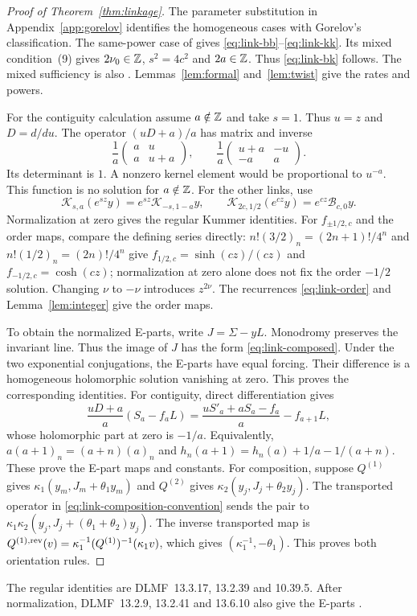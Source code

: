 \begin{proof}[Proof of Theorem~\ref{thm:linkage}]
The parameter substitution in Appendix~\ref{app:gorelov} identifies the
homogeneous cases with Gorelov's classification. The same-power case of
\cite[Lemma~14, using Lemma~12, p.~7]{Gorelov2021} gives
\eqref{eq:link-bb}--\eqref{eq:link-kk}. Its mixed condition~(9)
\cite[p.~3]{Gorelov2021} gives
$2\nu_0\in\mathbb{Z}$, $s^2=4c^2$ and $2a\in\mathbb{Z}$. Thus
\eqref{eq:link-bk} follows. The mixed sufficiency is also
\cite[Theorem~2, p.~138]{Gorelov2020}. Lemmas~\ref{lem:formal}
and~\ref{lem:twist} give the rates and powers.

For the contiguity calculation assume $a\notin\mathbb{Z}$ and take $s=1$. Thus $u=z$ and $D=d/du$.
The operator $(uD+a)/a$ has matrix and inverse
\begin{equation}\label{eq:contiguity-matrix}
 \frac1a\begin{pmatrix}a&u\\a&u+a\end{pmatrix},\qquad
 \frac1a\begin{pmatrix}u+a&-u\\-a&a\end{pmatrix}.
\end{equation}
Its determinant is $1$. A nonzero kernel element would be proportional to $u^{-a}$.
This function is no solution for $a\notin\mathbb{Z}$. For the other links, use
\[
 \mathscr K_{s,a}(e^{sz}y)=e^{sz}\mathscr K_{-s,1-a}y,\qquad
 \mathscr K_{2c,1/2}(e^{cz}y)=e^{cz}\mathscr B_{c,0}y.
\]
Normalization at zero gives the regular Kummer identities.
For $f_{\pm1/2,c}$ and the order maps, compare the defining series directly:
$n!(3/2)_n=(2n+1)!/4^n$ and $n!(1/2)_n=(2n)!/4^n$ give
$f_{1/2,c}=\sinh(cz)/(cz)$ and $f_{-1/2,c}=\cosh(cz)$;
normalization at zero alone does not fix the order $-1/2$ solution.
Changing $\nu$ to $-\nu$ introduces $z^{2\nu}$. The recurrences
\eqref{eq:link-order} and Lemma~\ref{lem:integer} give the order maps.

To obtain the normalized E-parts, write $J=\Sigma-yL$.
Monodromy preserves the invariant line. Thus the image of $J$ has the form
\eqref{eq:link-composed}. Under the two exponential conjugations, the
E-parts have equal forcing. Their difference is a homogeneous holomorphic solution vanishing at zero. This proves the corresponding identities. For contiguity, direct differentiation gives
\[
 \frac{uD+a}{a}(S_a-f_aL)
 =\frac{uS'_a+aS_a-f_a}{a}-f_{a+1}L,
\]
whose holomorphic part at zero is $-1/a$. Equivalently,
$a(a+1)_n=(a+n)(a)_n$ and
$h_n(a+1)=h_n(a)+1/a-1/(a+n)$. These prove the E-part maps and
constants. For composition, suppose $Q^{(1)}$ gives
$\kappa_1(y_m,J_m+\theta_1y_m)$ and $Q^{(2)}$ gives
$\kappa_2(y_j,J_j+\theta_2y_j)$. The transported operator in
\eqref{eq:link-composition-convention} sends the pair to
$\kappa_1\kappa_2(y_j,J_j+(\theta_1+\theta_2)y_j)$.
The inverse transported map is
$Q^{(1),\rm rev}(v)=\kappa_1^{-1}(Q^{(1)})^{-1}(\kappa_1v)$, which gives
$(\kappa_1^{-1},-\theta_1)$. This proves both orientation rules.
\end{proof}

The regular identities are DLMF~13.3.17, 13.2.39 and 10.39.5.
After normalization, DLMF~13.2.9, 13.2.41 and 13.6.10 also give the E-parts \cite{DLMF}.
